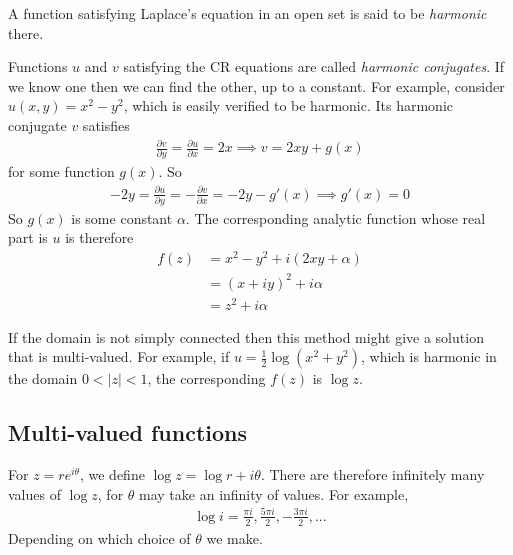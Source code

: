 \documentclass[a4paper]{article}
\begin{document}
A function satisfying Laplace's equation in an open set is said to be \emph{harmonic} there.

Functions $u$ and $v$ satisfying the CR equations are called \emph{harmonic conjugates}. If we know one then we can find the other, up to a constant. For example, consider $u(x,y) = x^2-y^2$, which is easily verified to be harmonic. Its harmonic conjugate $v$ satisfies
\begin{equation*}
\begin{aligned}
\frac{\partial v}{\partial y} = \frac{\partial u}{\partial x} = 2x \implies v = 2xy+g(x)
\end{aligned}
\end{equation*}
for some function $g(x)$. So
\begin{equation*}
\begin{aligned}
-2y = \frac{\partial u}{\partial y} = -\frac{\partial v}{\partial x} = -2y - g'(x) \implies g'(x) = 0
\end{aligned}
\end{equation*}
So $g(x)$ is some constant $\alpha$. The corresponding analytic function whose real part is $u$ is therefore
\begin{equation*}
\begin{aligned}
f(z) &= x^2-y^2+i(2xy+\alpha)\\
&=(x+iy)^2+i\alpha\\
&=z^2+i\alpha
\end{aligned}
\end{equation*}

If the domain is not simply connected then this method might give a solution that is multi-valued. For example, if $u=\frac{1}{2}\log(x^2+y^2)$, which is harmonic in the domain $0 < |z| < 1$, the corresponding $f(z)$ is $\log z$.

\subsection{Multi-valued functions}
For $z = re^{i\theta}$, we define $\log z = \log r + i \theta$. There are therefore infinitely many values of $\log z$, for $\theta$ may take an infinity of values. For example,
\begin{equation*}
\begin{aligned}
\log i = \frac{\pi i}{2}, \frac{5\pi i}{2}, -\frac{3\pi i}{2},...
\end{aligned}
\end{equation*}
Depending on which choice of $\theta$ we make.
\end{document}

